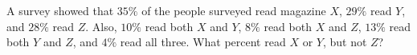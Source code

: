 A survey showed that $35\%$ of the people surveyed read magazine $X$, $29\%$ read $Y$, and $28\%$ read $Z$. Also, $10\%$ read both $X$ and $Y$, $8\%$ read both $X$ and $Z$, $13\%$ read both $Y$ and $Z$, and $4\%$ read all three. What percent read $X$ or $Y$, but not $Z$?
